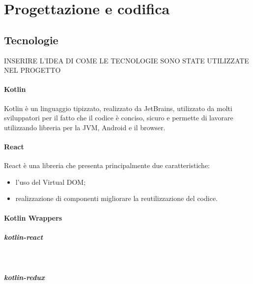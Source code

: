 
\chapter{Progettazione e codifica}
\label{cap:progettazione-codifica}


\section{Tecnologie}
\label{sec:tecnologie}
INSERIRE L'IDEA DI COME LE TECNOLOGIE SONO STATE UTILIZZATE NEL PROGETTO

\subsubsection*{Kotlin}
Kotlin è un linguaggio tipizzato, realizzato da JetBrains, utilizzato da molti sviluppatori per il fatto che il codice è conciso, sicuro e permette di lavorare utilizzando libreria per la JVM, Android e il browser.

\subsubsection*{React}
React è una libreria che presenta principalmente due caratteristiche:
\begin{itemize}
	\item l'uso del Virtual DOM;
	\item realizzazione di componenti migliorare la reutilizzazione del codice.
\end{itemize}

\subsubsection*{Kotlin Wrappers}
\paragraph{kotlin-react} \mbox{} \\
\paragraph{kotlin-redux} \mbox{} \\
